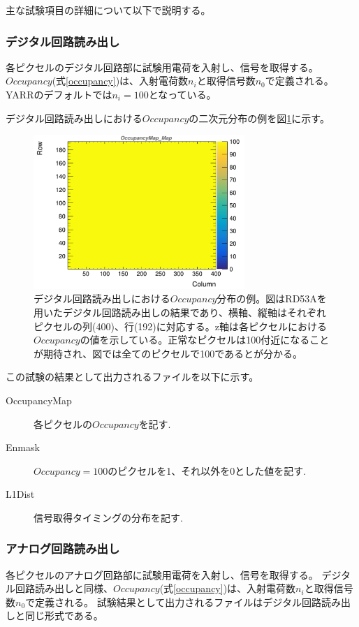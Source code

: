 主な試験項目の詳細について以下で説明する。

\subsubsection{デジタル回路読み出し}
各ピクセルのデジタル回路部に試験用電荷を入射し、信号を取得する。
$Occupancy$(式\ref{occupancy})は、入射電荷数$n_i$と取得信号数$n_0$で定義される。
YARRのデフォルトでは$n_i=100$となっている。

デジタル回路読み出しにおける$Occupancy$の二次元分布の例を図\ref{dig_occ}に示す。
\begin{figure}[bpt]\centering
\includegraphics[width=8cm]{dig_occ}
\caption[デジタル回路読み出しにおける$Occupancy$分布の例。]{デジタル回路読み出しにおける$Occupancy$分布の例。図はRD53Aを用いたデジタル回路読み出しの結果であり、横軸、縦軸はそれぞれピクセルの列(400)、行(192)に対応する。z軸は各ピクセルにおける$Occupancy$の値を示している。正常なピクセルは100付近になることが期待され、図では全てのピクセルで100であるとが分かる。}
\label{dig_occ}
\end{figure}

この試験の結果として出力されるファイルを以下に示す。
\begin{description}
  \item [OccupancyMap] 各ピクセルの$Occupancy$を記す.
  \item [Enmask] $Occupancy=100$のピクセルを1、それ以外を0とした値を記す.
  \item [L1Dist] 信号取得タイミングの分布を記す.
\end{description}

\subsubsection{アナログ回路読み出し}
各ピクセルのアナログ回路部に試験用電荷を入射し、信号を取得する。
デジタル回路読み出しと同様、$Occupancy$(式\ref{occupancy})は、入射電荷数$n_i$と取得信号数$n_0$で定義される。
試験結果として出力されるファイルはデジタル回路読み出しと同じ形式である。

